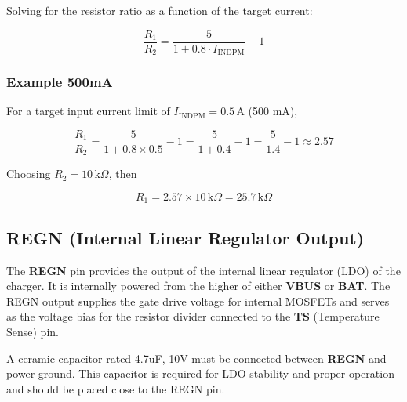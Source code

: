 \documentclass[12pt]{article}
\begin{document}
Solving for the resistor ratio as a function of the target current:

\begin{equation}
\frac{R_1}{R_2} = \frac{5}{1 + 0.8 \cdot I_{\text{INDPM}}} - 1
\label{equ:resistor_ratio}
\end{equation}

\subsubsection{Example 500mA}
For a target input current limit of \( I_{\text{INDPM}} = 0.5\,\text{A} \) (500 mA),

\begin{equation}
\frac{R_1}{R_2} = \frac{5}{1 + 0.8 \times 0.5} - 1 = \frac{5}{1 + 0.4} - 1 = \frac{5}{1.4} - 1 \approx 2.57
\label{equ:resistor_ratio_example}
\end{equation}

Choosing \( R_2 = 10\,\text{k}\Omega \), then

\begin{equation}
R_1 = 2.57 \times 10\,\text{k}\Omega = 25.7\,\text{k}\Omega
\label{equ:R1_value_example}
\end{equation}


\subsection{REGN (Internal Linear Regulator Output)}
The \textbf{REGN} pin provides the output of the internal linear regulator (LDO) of the charger. It is internally powered from the higher of either \textbf{VBUS} or \textbf{BAT}. The REGN output supplies the gate drive voltage for internal MOSFETs and serves as the voltage bias for the resistor divider connected to the \textbf{TS} (Temperature Sense) pin.

A ceramic capacitor rated 4.7uF, 10V must be connected between \textbf{REGN} and power ground. This capacitor is required for LDO stability and proper operation and should be placed close to the REGN pin.
\end{document}
